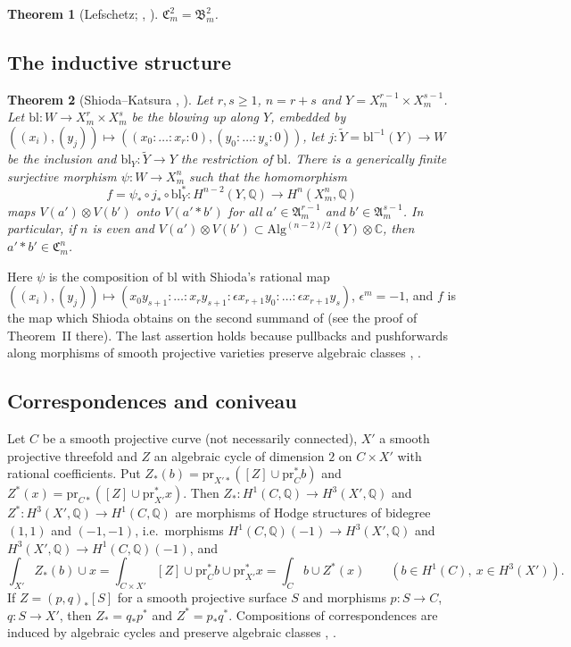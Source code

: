 \documentclass[11pt]{amsart}
\newtheorem{theorem}{Theorem}[section]
\theoremstyle{definition}
\theoremstyle{remark}
\numberwithin{equation}{section}
\newcommand{\Q}{\mathbb{Q}}
\newcommand{\C}{\mathbb{C}}
\newcommand{\fA}{\mathfrak{A}}
\newcommand{\fB}{\mathfrak{B}}
\newcommand{\fC}{\mathfrak{C}}
\newcommand{\pr}{\mathrm{pr}}
\begin{document}
\begin{theorem}[Lefschetz; {\cite[(1.10)]{Sh79}, \cite[p.~163]{GH78}}]\label{thm:lef}
$\fC^2_m=\fB^2_m$.
\end{theorem}

\subsection{The inductive structure}\label{subsec:SK}

\begin{theorem}[{Shioda--Katsura \cite[(2.1), Thm.~II, (2.14)]{Sh79}, \cite{SK79}}]\label{thm:SK}
Let $r,s\ge1$, $n=r+s$ and $Y=X^{r-1}_m\times X^{s-1}_m$. Let $\mathrm{bl}\colon W\to X^r_m\times X^s_m$ be the blowing up along $Y$, embedded by $((x_i),(y_j))\mapsto((x_0:\dots:x_r:0),(y_0:\dots:y_s:0))$, let $j\colon\widetilde Y=\mathrm{bl}^{-1}(Y)\to W$ be the inclusion and $\mathrm{bl}_Y\colon\widetilde Y\to Y$ the restriction of $\mathrm{bl}$. There is a generically finite surjective morphism $\psi\colon W\to X^n_m$ such that the homomorphism
\[
f=\psi_*\circ j_*\circ\mathrm{bl}_Y^*\colon H^{n-2}(Y,\Q)\to H^n(X^n_m,\Q)
\]
maps $V(a')\otimes V(b')$ onto $V(a'*b')$ for all $a'\in\fA^{r-1}_m$ and $b'\in\fA^{s-1}_m$. In particular, if $n$ is even and $V(a')\otimes V(b')\subset\mathrm{Alg}^{(n-2)/2}(Y)\otimes\C$, then $a'*b'\in\fC^n_m$.
\end{theorem}

Here $\psi$ is the composition of $\mathrm{bl}$ with Shioda's rational map $((x_i),(y_j))\mapsto(x_0y_{s+1}:\dots:x_ry_{s+1}:\epsilon x_{r+1}y_0:\dots:\epsilon x_{r+1}y_s)$, $\epsilon^m=-1$, and $f$ is the map which Shioda obtains on the second summand of \cite[(2.4)]{Sh79} (see the proof of Theorem~II there). The last assertion holds because pullbacks and pushforwards along morphisms of smooth projective varieties preserve algebraic classes \cite{BH61}, \cite[Ch.~19]{Fu98}.

\subsection{Correspondences and coniveau}\label{subsec:corr}
Let $C$ be a smooth projective curve (not necessarily connected), $X'$ a smooth projective threefold and $Z$ an algebraic cycle of dimension $2$ on $C\times X'$ with rational coefficients. Put $Z_*(b)=\pr_{X'*}([Z]\cup\pr_C^*b)$ and $Z^*(x)=\pr_{C*}([Z]\cup\pr_{X'}^*x)$. Then $Z_*\colon H^1(C,\Q)\to H^3(X',\Q)$ and $Z^*\colon H^3(X',\Q)\to H^1(C,\Q)$ are morphisms of Hodge structures of bidegree $(1,1)$ and $(-1,-1)$, i.e.\ morphisms $H^1(C,\Q)(-1)\to H^3(X',\Q)$ and $H^3(X',\Q)\to H^1(C,\Q)(-1)$, and
\begin{equation}\label{eq:adj}
\int_{X'} Z_*(b)\cup x=\int_{C\times X'}[Z]\cup\pr_C^*b\cup\pr_{X'}^*x=\int_C b\cup Z^*(x)\qquad(b\in H^1(C),\ x\in H^3(X')).
\end{equation}
If $Z=(p,q)_*[S]$ for a smooth projective surface $S$ and morphisms $p\colon S\to C$, $q\colon S\to X'$, then $Z_*=q_*p^*$ and $Z^*=p_*q^*$. Compositions of correspondences are induced by algebraic cycles and preserve algebraic classes \cite{BH61}, \cite[Ch.~16, 19]{Fu98}.
\end{document}
